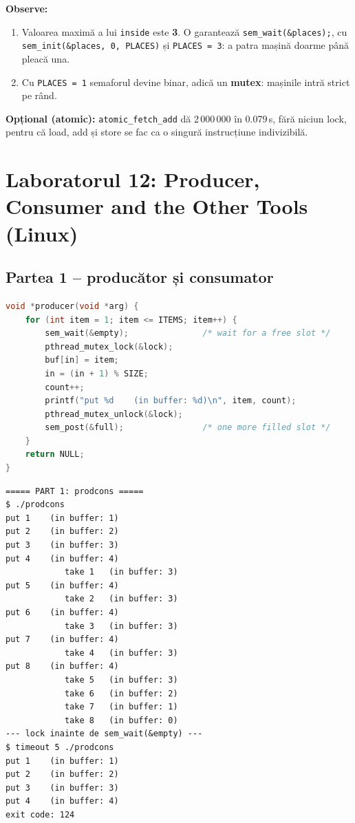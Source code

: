 \documentclass[12pt,a4paper]{article}
\begin{document}
\textbf{Observe:}
\begin{enumerate}
    \item Valoarea maximă a lui \texttt{inside} este \textbf{3}. O garantează \texttt{sem\_wait(\&places);}, cu \texttt{sem\_init(\&places, 0, PLACES)} și \texttt{PLACES = 3}: a patra mașină doarme până pleacă una.
    \item Cu \texttt{PLACES = 1} semaforul devine binar, adică un \textbf{mutex}: mașinile intră strict pe rând.
\end{enumerate}
\textbf{Opțional (atomic):} \texttt{atomic\_fetch\_add} dă 2\,000\,000 în 0.079\,s, fără niciun lock, pentru că load, add și store se fac ca o singură instrucțiune indivizibilă.

\newpage
\section{Laboratorul 12: Producer, Consumer and the Other Tools (Linux)}

\subsection{Partea 1 -- producător și consumator}
\begin{lstlisting}[caption={prodcons.c -- producătorul (empty = sloturi libere, full = sloturi ocupate)},language=C]
void *producer(void *arg) {
    for (int item = 1; item <= ITEMS; item++) {
        sem_wait(&empty);               /* wait for a free slot */
        pthread_mutex_lock(&lock);
        buf[in] = item;
        in = (in + 1) % SIZE;
        count++;
        printf("put %d    (in buffer: %d)\n", item, count);
        pthread_mutex_unlock(&lock);
        sem_post(&full);                /* one more filled slot */
    }
    return NULL;
}
\end{lstlisting}
\begin{lstlisting}[caption={prodcons normal și cu lock înainte de sem\_wait(\&empty)}]
===== PART 1: prodcons =====
$ ./prodcons
put 1    (in buffer: 1)
put 2    (in buffer: 2)
put 3    (in buffer: 3)
put 4    (in buffer: 4)
            take 1   (in buffer: 3)
put 5    (in buffer: 4)
            take 2   (in buffer: 3)
put 6    (in buffer: 4)
            take 3   (in buffer: 3)
put 7    (in buffer: 4)
            take 4   (in buffer: 3)
put 8    (in buffer: 4)
            take 5   (in buffer: 3)
            take 6   (in buffer: 2)
            take 7   (in buffer: 1)
            take 8   (in buffer: 0)
--- lock inainte de sem_wait(&empty) ---
$ timeout 5 ./prodcons
put 1    (in buffer: 1)
put 2    (in buffer: 2)
put 3    (in buffer: 3)
put 4    (in buffer: 4)
exit code: 124
\end{lstlisting}
\end{document}
